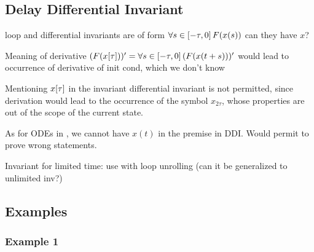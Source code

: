 \documentclass[10pt]{report}
\begin{document}
    \subsection{Delay Differential Invariant}
        \label{sec:delay-differential-invariant}

        loop and differential invariants are of form $\forall s\in[-\tau,0]{\,} F(x(s))$
        can they have $x$?

        Meaning of derivative $(F(x[\tau]))'=\forall s\in[-\tau,0]{\,} (F(x(t+s)))'$ would lead to occurrence of derivative of init cond, which we don't know

        Mentioning $x[\tau]$ in the invariant differential invariant is not permitted, since derivation would lead to the occurrence of the symbol $x_{2\tau}$, whose properties are out of the scope of the current state.

        As for ODEs in \dL, we cannot have $x(t)$ in the premise in DDI. Would permit to prove wrong statements.

        Invariant for limited time: use with loop unrolling (can it be generalized to unlimited inv?)

    \subsection{Examples}
        \label{sec:examples}

        \subsubsection{Example 1}
            \label{sec:ddi-example-1}
\end{document}
